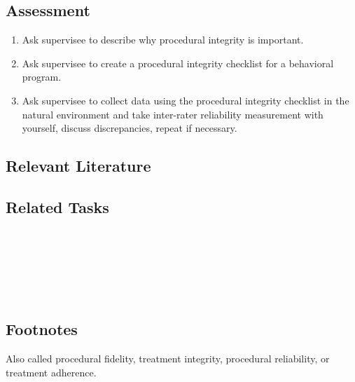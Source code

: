 \subsection{Assessment}
\begin{enumerate}
\item Ask supervisee to describe why procedural integrity is important.
\item Ask supervisee to create a procedural integrity checklist for a behavioral program.
\item Ask supervisee to collect data using the procedural integrity checklist in the natural environment and take inter-rater reliability measurement with yourself, discuss discrepancies, repeat if necessary.
\end{enumerate}
%
\subsection{Relevant Literature}
\begin{refsection}
\nocite{cooper2007applied,
        johnston2010strategies,
        wolery1994procedural}
\printbibliography[heading=none]
\end{refsection} 
%                         
\subsection{Related Tasks}
\fourfOne{}\\
\fourhThree{}\\
\fourhFour{}\\
\fourkThree{}\\
\fourkFour{}\\
%
\subsection{Footnotes}
Also called procedural fidelity, treatment integrity, procedural reliability, or treatment adherence.
